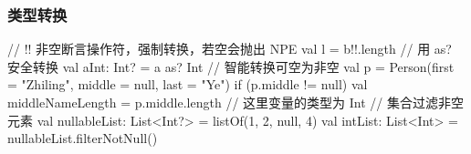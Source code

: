 \begin{frame}[fragile]
    \frametitle{类型转换}
    \begin{kotlincode}[basicstyle=\scriptsize\ttfamily]
    // !! 非空断言操作符，强制转换，若空会抛出 NPE
    val l = b!!.length
    // 用 as? 安全转换
    val aInt: Int? = a as? Int
    // 智能转换可空为非空
    val p = Person(first = "Zhiling", middle = null, last = "Ye")
    if (p.middle != null) {
        val middleNameLength = p.middle.length // 这里变量的类型为 Int
    }
    // 集合过滤非空元素
    val nullableList: List<Int?> = listOf(1, 2, null, 4)
    val intList: List<Int> = nullableList.filterNotNull()
    \end{kotlincode}
\end{frame}


